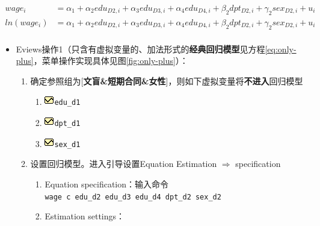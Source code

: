 \documentclass[12pt,(landscape,a4paper),(portrait,a4paper)]{article}
\providecommand{\tightlist}{%
  \setlength{\itemsep}{0pt}\setlength{\parskip}{0pt}}
\theoremstyle{definition}
\theoremstyle{definition}
\theoremstyle{definition}
\theoremstyle{remark}
\begin{document}
\begin{align}
wage_i & =\alpha_1+\alpha_2edu_{D2,i}+\alpha_3edu_{D3,i}+\alpha_4edu_{D4,i}+\beta_2 dpt_{D2,i}+\gamma_2 sex_{D2,i}+u_i  \label{eq:only-plus} \\
ln(wage_i) & =\alpha_1+\alpha_2edu_{D2,i}+\alpha_3edu_{D3,i}+\alpha_4edu_{D4,i}+\beta_2 dpt_{D2,i}+\gamma_2 
sex_{D2,i}+u_i  \label{eq:only-plus-log}\\
\end{align}

\begin{itemize}
\tightlist
\item
  Eviews操作1（只含有虚拟变量的、加法形式的\textbf{经典回归模型}见方程\eqref{eq:only-plus}，菜单操作实现具体见图\ref{fig:only-plus}）：

  \begin{enumerate}
  \def\labelenumi{\arabic{enumi})}
  \tightlist
  \item
    确定参照组为{[}\textbf{文盲\&短期合同\&女性}{]}，则如下虚拟变量将\textbf{不进入}回归模型

    \begin{enumerate}
    \def\labelenumii{\alph{enumii}.}
    \tightlist
    \item
      \includegraphics{picture/object/Series.png}\texttt{edu\_d1}
    \item
      \includegraphics{picture/object/Series.png}\texttt{dpt\_d1}
    \item
      \includegraphics{picture/object/Series.png}\texttt{sex\_d1}
    \end{enumerate}
  \item
    设置回归模型。进入引导设置Equation Estimation \(\Rightarrow\)
    specification

    \begin{enumerate}
    \def\labelenumii{\alph{enumii}.}
    \tightlist
    \item
      Equation
      specification：输入命令\texttt{wage\ c\ edu\_d2\ edu\_d3\ edu\_d4\ dpt\_d2\ sex\_d2}
    \item
      Estimation settings：


\end{enumerate}
\end{enumerate}
\end{itemize}
\end{document}
